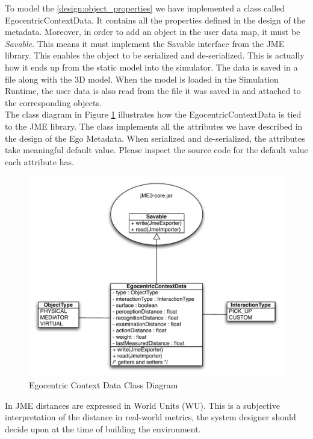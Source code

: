 To model the \ref{design:object_properties} we have implemented a class called EgocentricContextData. It contains all the properties defined in the design of the metadata. Moreover, in order to add an object in the user data map, it must be \emph{Savable}. This means it must implement the Savable interface from the JME library. This enables the object to be serialized and de-serialized. This is actually how it ends up from the static model into the simulator. The data is saved in a file along with the 3D model. When the model is loaded in the Simulation Runtime, the user data is also read from the file it was saved in and attached to the corresponding objects.\\

The class diagram in Figure \ref{fig:impl_egocentric_context_data} illustrates how the EgocentricContextData is tied to the JME library. The class implements all the attributes we have described in the design of the Ego Metadata. When serialized and de-serialized, the attributes take meaningful default value. Please inspect the source code for the default value each attribute has.
\begin{figure}[H]
	\centering
	\includegraphics[width=\linewidth]{gfx/Chapter4/ego_metadata}
	\caption{Egocentric Context Data Class Diagram}
	\label{fig:impl_egocentric_context_data}
\end{figure}

In JME distances are expressed in World Units (WU). This is a subjective interpretation of the distance in real-world metrics, the system designer should decide upon at the time of building the environment.\\

